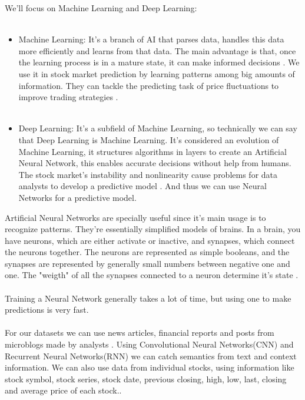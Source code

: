 \documentclass[conference]{IEEEtran}
\begin{document}
We'll focus on Machine Learning and Deep Learning:
\\\\
\begin{itemize}
  \item Machine Learning: It's a branch of AI that parses data, handles this data more efficiently and learns from that data. The main advantage is that, once
  the learning process is in a mature state, it can make informed decisions \cite{dey2016machine}. We use it in stock market prediction by learning patterns among big amounts of information.
  They can tackle the predicting task of price fluctuations to improve trading strategies \cite{nabipour2020predicting}.
  \\\\
  \item Deep Learning: It's a subfield of Machine Learning, so technically we can say that Deep Learning is Machine Learning.
  It's considered an evolution of Machine Learning, it structures algorithms in layers to create an Artificial Neural Network, this enables accurate decisions
  without help from humans. The stock market's instability and nonlinearity cause problems for data analysts to develop a predictive model \cite{nabipour2020predicting}. And thus we can use Neural Networks for a predictive model.
\end{itemize}
Artificial Neural Networks are specially useful since it's main usage is to recognize patterns. They're essentially simplified models of brains. In a brain, you have neurons, which are either activate or inactive,
and synapses, which connect the neurons together. The neurons are represented as simple booleans, and the synapses are represented by generally small numbers between negative one and one. The "weigth" of all the
synapses connected to a neuron determine it's state \cite{M2018}.
\\\\
Training a Neural Network generally takes a lot of time, but using one to make predictions is very fast.
\\\\
For our datasets we can use news articles, financial reports and posts from microblogs made by analysts \cite{Vargas2017}. Using Convolutional Neural Networks(CNN) and Recurrent Neural Networks(RNN) we can
catch semantics from text and context information. We can also use data from individual stocks, using information like stock symbol, stock series, stock date, previous closing, high, low, last, closing and average price of each stock.\cite{M2018}.
\end{document}
